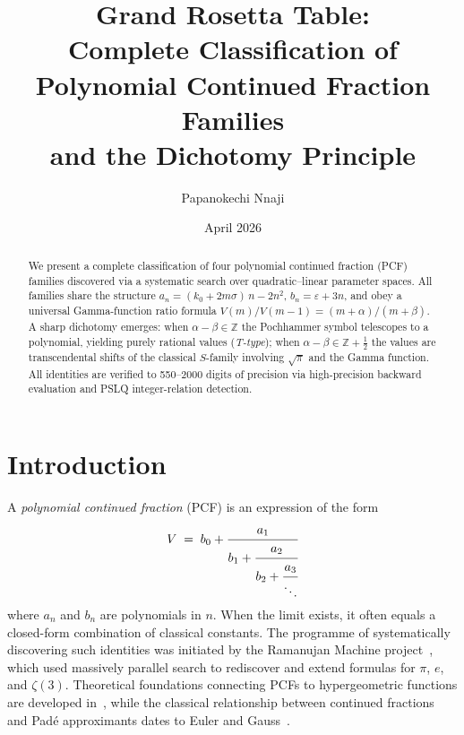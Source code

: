 \documentclass[11pt,a4paper]{article}
\title{Grand Rosetta Table:\\
  Complete Classification of Polynomial Continued Fraction Families\\
  and the Dichotomy Principle}
\author{Papanokechi Nnaji}
\date{April 2026}
\theoremstyle{definition}
\theoremstyle{remark}
\begin{document}
\maketitle

\begin{abstract}
We present a complete classification of four polynomial continued fraction (PCF)
families discovered via a systematic search over quadratic--linear parameter
spaces.  All families share the structure $a_n = (k_0 + 2m\sigma)\,n - 2n^2$,
$b_n = \varepsilon + 3n$, and obey a universal Gamma-function ratio formula
$V(m)/V(m{-}1) = (m+\alpha)/(m+\beta)$.  A sharp dichotomy emerges:
when $\alpha - \beta \in \mathbb{Z}$ the Pochhammer symbol telescopes to a
polynomial, yielding purely rational values (\emph{T-type});
when $\alpha - \beta \in \mathbb{Z} + \tfrac{1}{2}$ the values are
transcendental shifts of the classical $S$-family involving $\sqrt\pi$
and the Gamma function.
All identities are verified to 550--2000 digits of precision via
high-precision backward evaluation and PSLQ integer-relation detection.
\end{abstract}

\section{Introduction}\label{sec:intro}

A \emph{polynomial continued fraction} (PCF) is an expression of the form
\begin{equation}\label{eq:pcf-def}
  V \;=\; b_0 + \cfrac{a_1}{b_1 + \cfrac{a_2}{b_2 + \cfrac{a_3}{\ddots}}}
\end{equation}
where $a_n$ and $b_n$ are polynomials in $n$.
When the limit exists, it often equals a closed-form combination
of classical constants.  The programme of systematically discovering
such identities was initiated by the Ramanujan Machine
project~\cite{raab2021ramanujan}, which used massively parallel search
to rediscover and extend formulas for $\pi$, $e$, and $\zeta(3)$.
Theoretical foundations connecting PCFs to hypergeometric functions
are developed in~\cite{aptekarev2007turan,borwein2004mathematics},
while the classical relationship between continued fractions and
Pad\'e approximants dates to Euler and Gauss~\cite{jones1980continued}.
\end{document}
